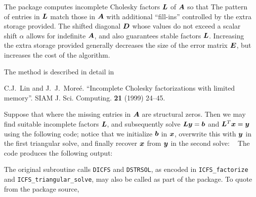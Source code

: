 \documentclass{galahad}
\newcommand{\packagename}{ICFS}
\begin{document}

\galmethod
The package computes incomplete Cholesky factors ${\bm{L}}$ of ${\bm{A}}$ so that
The pattern of entries in ${\bm{L}}$ match those in ${\bm{A}}$ with additional
``fill-ins'' controlled by the extra storage provided. The shifted diagonal
${\bm{D}}$ whose values do not exceed a scalar shift $\alpha$ allows for
indefinite ${\bm{A}}$, and also guarantees stable factors ${\bm{L}}$. Increasing the
extra storage provided generally decreases the size of the error matrix
${\bm{E}}$, but increases the cost of the algorithm.

\vspace*{1mm}

\galreference
\vspace*{1mm}

\noindent
The method is described in detail in
\vspace*{1mm}

\noindent
C.\-J.\ Lin and J.\ J.\ More\'{e}. ``Incomplete Cholesky factorizations
with limited memory''.  SIAM J. Sci. Computing. {\bf 21} (1999) 24--45.


\galexamples
Suppose that
where the missing entries in ${\bm{A}}$ are structural zeros. Then we may find
suitable incomplete factors ${\bm{L}}$, and subsequently solve
${\bm{L}} {\bm{y}} = {\bm{b}}$ and ${\bm{L}}^T {\bm{x}} = {\bm{y}}$ using the following code;
notice that we initialize ${\bm{b}}$ in ${\bm{x}}$, overwrite this with ${\bm{y}}$ in the
first triangular solve, and finally recover ${\bm{x}}$ from ${\bm{y}}$
in the second solve:
{\tt \small
\VerbatimInput{\packageexample}
}
\noindent
The code produces the following output:
{\tt \small
\VerbatimInput{\packageresults}
}
\noindent


\galappendix
The original subroutine calls {\tt DICFS} and {\tt DSTRSOL},
as encoded in {\tt \packagename\_factorize} and
{\tt \packagename\_triangular\_solve},
may also be called as part of the package. To quote from the package source,
\end{document}
